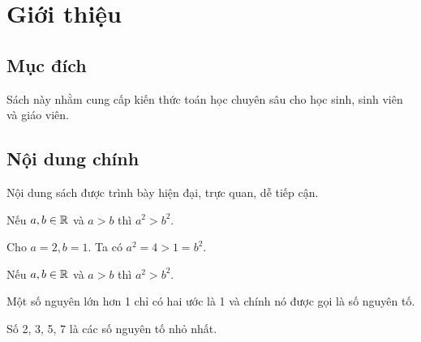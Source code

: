 \chapter{Giới thiệu}

\section{Mục đích}
Sách này nhằm cung cấp kiến thức toán học chuyên sâu cho học sinh, sinh viên và giáo viên.

\section{Nội dung chính}
Nội dung sách được trình bày hiện đại, trực quan, dễ tiếp cận.

\begin{dinhly}[Ví dụ định lý]
Nếu $a, b \in \mathbb{R}$ và $a > b$ thì $a^2 > b^2$.
\end{dinhly}

\begin{vidu}
Cho $a = 2, b = 1$. Ta có $a^2 = 4 > 1 = b^2$.
\end{vidu}

\begin{lythuyet}
Nếu $a, b \in \mathbb{R}$ và $a > b$ thì $a^2 > b^2$.
\end{lythuyet}

\begin{dinhnghiaBox}[Số nguyên tố]
Một số nguyên lớn hơn 1 chỉ có hai ước là 1 và chính nó được gọi là số nguyên tố.
\end{dinhnghiaBox}

\begin{viduBox}[Ví dụ về số nguyên tố]
Số 2, 3, 5, 7 là các số nguyên tố nhỏ nhất.
\end{viduBox}